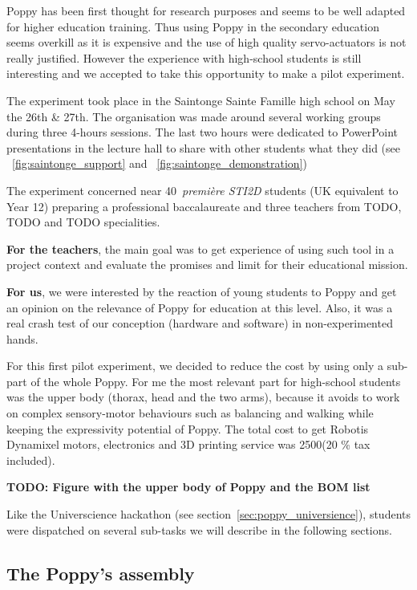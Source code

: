 Poppy has been first thought for research purposes and seems to be well adapted for higher education training. Thus using Poppy in the secondary education seems overkill as it is expensive and the use of high quality servo-actuators is not really justified. However the experience with high-school students is still interesting and we accepted to take this opportunity to make a pilot experiment.


The experiment took place in the Saintonge Sainte Famille high school on May the 26th \& 27th. The organisation was made around several working groups during three 4-hours sessions. The last two hours were dedicated to PowerPoint presentations in the lecture hall to share with other students what they did (see \figurename~\ref{fig:saintonge_support} and \figurename~\ref{fig:saintonge_demonstration})

The experiment concerned near 40~\emph{première STI2D} students (UK equivalent to Year 12) preparing a professional baccalaureate and three teachers from TODO, TODO and TODO specialities.

\textbf{For the teachers}, the main goal was to get experience of using such tool in a project context and evaluate the promises and limit for their educational mission.

\textbf{For us}, we were interested by the reaction of young students to Poppy and get an opinion on the relevance of Poppy for education at this level. Also, it was a real crash test of our conception (hardware and software) in non-experimented hands.

For this first pilot experiment, we decided to reduce the cost by using only a sub-part of the whole Poppy. For me the most relevant part for high-school students was the upper body (thorax, head and the two arms), because it avoids to work on complex sensory-motor behaviours such as balancing and walking while keeping the expressivity potential of Poppy. The total cost to get Robotis Dynamixel motors, electronics and 3D printing service was 2500\texteuro (20 \% tax included).

\textbf{TODO: Figure with the upper body of Poppy and the BOM list}

Like the Universcience hackathon (see section~\ref{sec:poppy_universience}), students were dispatched on several sub-tasks we will describe in the following sections.


\subsection{The Poppy's assembly} %

